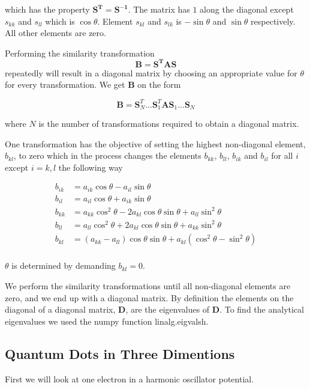 \documentclass{article}
\begin{document}
which has the property $\mathbf{S^T}=\mathbf{S^{-1}}$. The matrix has $1$ along the diagonal except $s_{kk}$ and $s_{ll}$ which is $\cos\theta$. Element $s_{kl}$ and $s_{lk}$ is $-\sin\theta$ and $\sin\theta$ respectively. All other elements are zero.

Performing the similarity transformation
$$\mathbf{B}=\mathbf{S^TAS}$$
repeatedly will result in a diagonal matrix by choosing an appropriate value for $\theta$ for every transformation. We get $\mathbf{B}$ on the form

$$\mathbf{B}=\mathbf{S}^T_N...\mathbf{S}^T_1\mathbf{A}\mathbf{S}_1...\mathbf{S}_N$$

where $N$ is the number of transformations required to obtain a diagonal matrix.

One transformation has the objective of setting the highest non-diagonal element, $b_{kl}$, to zero which in the process changes the elements $b_{kk}$, $b_{ll}$, $b_{ik}$ and $b_{il}$ for all $i$ except $i=k,l$ the following way

\begin{equation*}
\begin{split}
b_{ik}&=a_{ik}\cos\theta-a_{il}\sin\theta\\
b_{il}&=a_{il}\cos\theta+a_{ik}\sin\theta\\
b_{kk}&=a_{kk}\cos^2\theta-2a_{kl}\cos\theta\sin\theta+a_{ll}\sin^2\theta\\
b_{ll}&=a_{ll}\cos^2\theta+2a_{kl}\cos\theta\sin\theta+a_{kk}\sin^2\theta\\
b_{kl}&=(a_{kk}-a_{ll})\cos\theta\sin\theta+a_{kl}(\cos^2\theta-\sin^2\theta)\\
\end{split}
\end{equation*}

$\theta$ is determined by demanding $b_{kl}=0$.

We perform the similarity transformations until all non-diagonal elements are zero, and we end up with a diagonal matrix. By definition the elements on the diagonal of a diagonal matrix, $\mathbf{D}$, are the eigenvalues of $\mathbf{D}$.
\vskip0.5cm
To find the analytical eigenvalues we used the numpy function linalg.eigvalsh.

\subsection{Quantum Dots in Three Dimentions}


First we will look at one electron in a harmonic oscillator potential.
\end{document}
